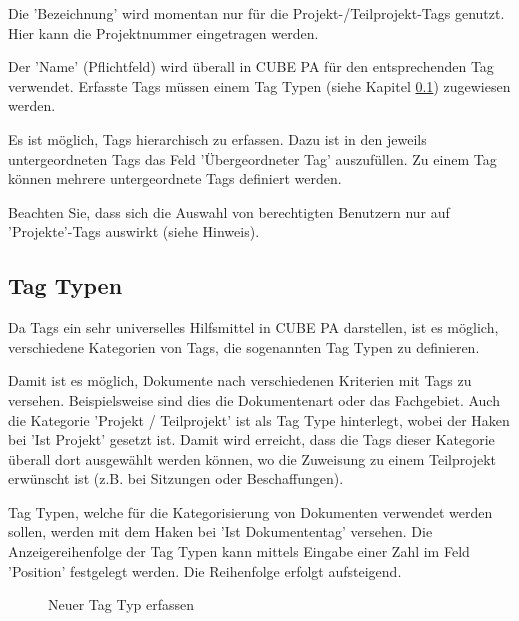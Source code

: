 Die 'Bezeichnung' wird momentan nur für die Projekt-/Teilprojekt-Tags genutzt. Hier kann die Projektnummer eingetragen werden.

\vspace{\baselineskip}

Der 'Name' (Pflichtfeld) wird überall in CUBE PA für den entsprechenden Tag verwendet. Erfasste Tags müssen einem Tag Typen (siehe Kapitel \ref{bkm:Ref444100222}) zugewiesen werden.

\vspace{\baselineskip}

Es ist möglich, Tags hierarchisch zu erfassen. Dazu ist in den jeweils untergeordneten Tags das Feld 'Übergeordneter Tag' auszufüllen. Zu einem Tag können mehrere untergeordnete Tags definiert werden.

\vspace{\baselineskip}

Beachten Sie, dass sich die Auswahl von berechtigten Benutzern nur auf 'Projekte'-Tags auswirkt (siehe Hinweis).

\subsection{Tag Typen}
\label{bkm:Ref444100222}
Da Tags ein sehr universelles Hilfsmittel in CUBE PA darstellen, ist es möglich, verschiedene Kategorien von Tags, die sogenannten Tag Typen zu definieren. \newline

Damit ist es möglich, Dokumente nach verschiedenen Kriterien mit Tags zu versehen. Beispielsweise sind dies die Dokumentenart oder das Fachgebiet. Auch die Kategorie 'Projekt / Teilprojekt' ist als Tag Type hinterlegt, wobei der Haken bei 'Ist Projekt' gesetzt ist. Damit wird erreicht, dass die Tags dieser Kategorie überall dort ausgewählt werden können, wo die Zuweisung zu einem Teilprojekt erwünscht ist (z.B. bei Sitzungen oder Beschaffungen). \newline

Tag Typen, welche für die Kategorisierung von Dokumenten verwendet werden sollen, werden mit dem Haken bei 'Ist Dokumententag' versehen. Die Anzeigereihenfolge der Tag Typen kann mittels Eingabe einer Zahl im Feld 'Position' festgelegt werden. Die Reihenfolge erfolgt aufsteigend.

\begin{figure}[H]
\caption{Neuer Tag Typ erfassen}
\end{figure}

